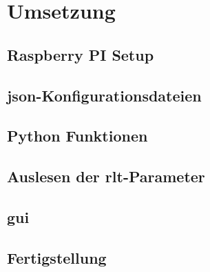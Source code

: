 \chapter{Umsetzung}

\section{Raspberry PI Setup}
\setAuthor{\pezze}


\setAuthor{\mangeng}


\section{\acs{json}-Konfigurationsdateien}
\setAuthor{\pezze}



\setAuthor{\schneider}


\section{Python Funktionen}
\setAuthor{\pezze}


\section{Auslesen der \acs{rlt}-Parameter}
\setAuthor{\schneider}


\section{\acf{gui}}
\setAuthor{\pezze}



\section{Fertigstellung}
\setAuthor{\schneider}


\setAuthor{\pezze}



